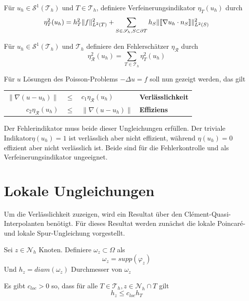 \begin{definition}[Verfeinerungsindikator]
	Für $u_h \in \mathscr{S}^1(\mathscr{T}_h) \text{ und } T \in \mathscr{T}_h$, definiere Verfeinerungsindikator $\eta_T(u_h)$ durch
	\[
	\eta^2_T(u_h) = h^2_T\|f\|^2_{L^2(T)} + \sum_{S\in\mathscr{S}_h,S\subset\partial T} h_S\|\llbracket \nabla u_h \cdot n_S\rrbracket\|^2_{L^2(S)} \]
\end{definition}
\begin{definition}[Fehlerschätzer]
	Für $u_h \in \mathscr{S}^1(\mathscr{T}_h) \text{ und } \mathscr{T}_h$ definiere den Fehlerschätzer $\eta_\mathscr{R}$ durch
	\[
	\eta_\mathscr{R}^2(u_h)=\sum_{T\in\mathscr{T}_h} \eta^2_T(u_h)
	\]
\end{definition}
Für $u$ Lösungen des Poisson-Problems $-\Delta u = f$ soll nun gezeigt werden, das gilt \\
\begin{center}
	\begin{tabular}{r c l l}
		$\|\nabla(u-u_h)\|$ & $\leq$ & $c_1 \eta_\mathscr{R}(u_h)$ &\textbf{Verlässlichkeit} \\
		$c_2 \eta_\mathscr{R}(u_h)$ &$\leq$& $\|\nabla(u-u_h)\|$ &\textbf{Effiziens} \\
	\end{tabular}
\end{center}
Der Fehlerindikator muss beide dieser Ungleichungen erfüllen. Der triviale Indikator$\eta(u_h)=1$ ist verlässlich aber nicht effizient, während $\eta(u_h)=0$ effizient aber nicht verlässlich ist. Beide sind für die Fehlerkontrolle und als Verfeinerungsindikator ungeeignet.
\section{Lokale Ungleichungen}
Um die Verlässlichkeit zuzeigen, wird ein Resultat über den Clément-Quasi-Interpolanten benötigt. Für dieses Resultat werden zunächst die lokale Poincaré- und lokale Spur-Ungleichung vorgestellt.
\begin{definition}
	Sei $z \in \mathscr{N}_h$ Knoten. Definiere $\omega_z \subset \Omega$ als
	\[
	\omega_z = supp(\varphi_z)
	\]
	Und $h_z = diam(\omega_z)$ Durchmesser von $\omega_z$
\end{definition}
\begin{bemerkung}
	Es gibt $c_{loc} > 0$ so, dass für alle $T \in\mathscr{T}_h, z\in\mathscr{N}_h\cap T$ gilt
	\[
	h_z\leq c_{loc}h_T
	\]
\end{bemerkung}

